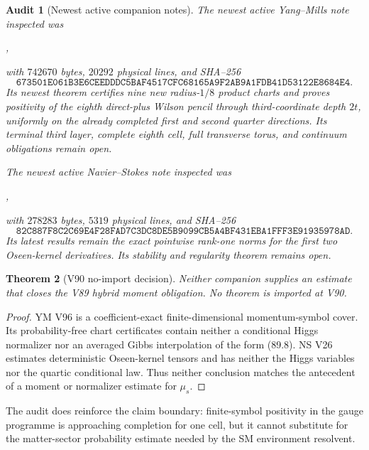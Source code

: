 \documentclass[11pt]{article}
\newtheorem{theorem}{Theorem}[section]
\newtheorem{audit}[theorem]{Audit}
\theoremstyle{remark}
\begin{document}
\begin{audit}[Newest active companion notes]
\label{aud:v17v90-companions}
The newest active Yang--Mills note inspected was
\begin{center}\footnotesize
{},
\end{center}
with \(742670\) bytes, \(20292\) physical lines, and SHA--256
\[
 \texttt{673501E061B3E6CEEDDDC5BAF4517CFC68165A9F2AB9A1FDB41D53122E8684E4}.
\]
Its newest theorem certifies nine new radius-\(1/8\) product charts
and proves positivity of the eighth direct-plus Wilson pencil through
third-coordinate depth \(2t\), uniformly on the already completed
first and second quarter directions.  Its terminal third layer,
complete eighth cell, full transverse torus, and continuum obligations
remain open.

The newest active Navier--Stokes note inspected was
\begin{center}\footnotesize
{},
\end{center}
with \(278283\) bytes, \(5319\) physical lines, and SHA--256
\[
 \texttt{82C887F8C2C69E4F28FAD7C3DC8DE5B9099CB5A4BF431EBA1FFF3E91935978AD}.
\]
Its latest results remain the exact pointwise rank-one norms for the
first two Oseen-kernel derivatives.  Its stability and regularity
theorem remains open.
\end{audit}

\begin{theorem}[V90 no-import decision]
\label{thm:v17v90-no-import}
Neither companion supplies an estimate that closes the V89 hybrid
moment obligation.  No theorem is imported at V90.
\end{theorem}

\begin{proof}
YM V96 is a coefficient-exact finite-dimensional momentum-symbol
cover.  Its probability-free chart certificates contain neither a
conditional Higgs normalizer nor an averaged Gibbs interpolation of
the form (89.8).  NS V26 estimates deterministic Oseen-kernel tensors
and has neither the Higgs variables nor the quartic conditional law.
Thus neither conclusion matches the antecedent of a moment or
normalizer estimate for \(\mu_s\).
\end{proof}

The audit does reinforce the claim boundary: finite-symbol positivity
in the gauge programme is approaching completion for one cell, but it
cannot substitute for the matter-sector probability estimate needed
by the SM environment resolvent.
\end{document}
